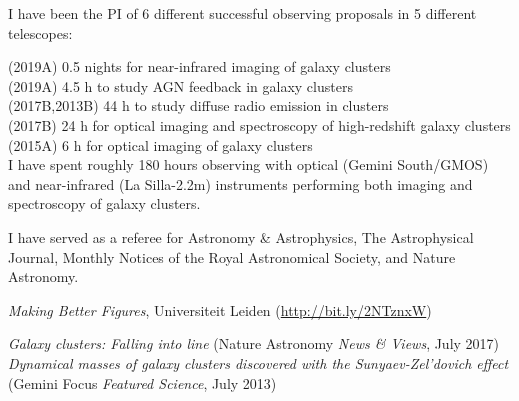 \documentclass[11pt]{article}
\begin{document}
\hline

\pagebreak



\noindent
I have been the PI of 6 different successful observing proposals in 5 different telescopes:

\noindent
{} (2019A) 0.5 nights for near-infrared imaging of galaxy clusters\\
 (2019A) 4.5 h to study AGN feedback in galaxy clusters\\
 (2017B,2013B) 44 h to study diffuse radio emission in clusters\\
 (2017B) 24 h for optical imaging and spectroscopy of high-redshift galaxy clusters\\
 (2015A) 6 h for optical imaging of galaxy clusters\\


{I have spent roughly 180 hours observing with 
optical (Gemini South/GMOS) and near-infrared (La Silla-2.2m) instruments performing both 
imaging and spectroscopy of galaxy clusters.}


%


\noindent
I have served as a referee for Astronomy \& Astrophysics, The Astrophysical Journal, Monthly Notices of the Royal Astronomical Society, and Nature Astronomy.


\noindent
{} \emph{Making Better Figures}, Universiteit Leiden (\url{http://bit.ly/2NTznxW})


\noindent
\emph{Galaxy clusters: Falling into line} (Nature Astronomy \emph{News \& Views}, July 2017)\\
\emph{Dynamical masses of galaxy clusters discovered with the Sunyaev-Zel'dovich effect} (Gemini Focus \emph{Featured Science}, July 2013)
\end{document}
